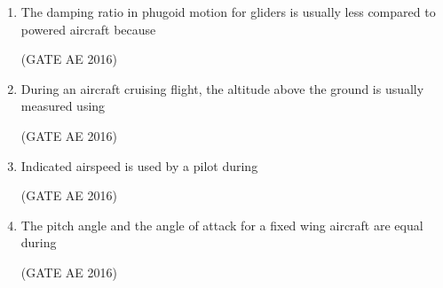 \documentclass[journal,12pt,onecolumn]{IEEEtran}
\theoremstyle{remark}
\begin{document}
\begin{enumerate}
\item The damping ratio in phugoid motion for gliders is usually less compared to powered aircraft because  
\begin{enumerate}
\end{enumerate}
\hfill(GATE AE 2016)



\item During an aircraft cruising flight, the altitude above the ground is usually measured using  
\begin{enumerate}
\end{enumerate}
\hfill(GATE AE 2016)



\item Indicated airspeed is used by a pilot during
\begin{enumerate}
\end{enumerate}
\hfill(GATE AE 2016)



\item The pitch angle and the angle of attack for a fixed wing aircraft are equal during
\begin{enumerate}
\end{enumerate}
\hfill(GATE AE 2016)




\end{enumerate}
\end{document}
